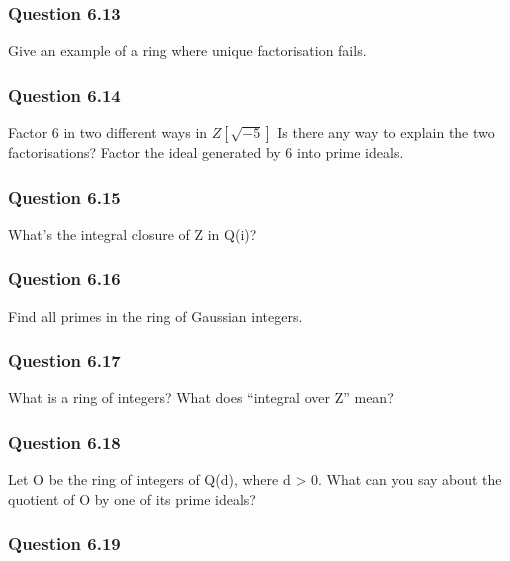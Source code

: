 \hypertarget{question-6.13}{%
\subsubsection{Question 6.13}\label{question-6.13}}

Give an example of a ring where unique factorisation fails.

\hypertarget{question-6.14}{%
\subsubsection{Question 6.14}\label{question-6.14}}

Factor 6 in two different ways in \(Z[\sqrt{-5}]\) Is there any way to
explain the two factorisations? Factor the ideal generated by 6 into
prime ideals.

\hypertarget{question-6.15}{%
\subsubsection{Question 6.15}\label{question-6.15}}

What's the integral closure of Z in Q(i)?

\hypertarget{question-6.16}{%
\subsubsection{Question 6.16}\label{question-6.16}}

Find all primes in the ring of Gaussian integers.

\hypertarget{question-6.17}{%
\subsubsection{Question 6.17}\label{question-6.17}}

What is a ring of integers? What does ``integral over Z'' mean?

\hypertarget{question-6.18}{%
\subsubsection{Question 6.18}\label{question-6.18}}

Let O be the ring of integers of Q(d), where d \textgreater{} 0. What
can you say about the quotient of O by one of its prime ideals?

\hypertarget{question-6.19}{%
\subsubsection{Question 6.19}\label{question-6.19}}

